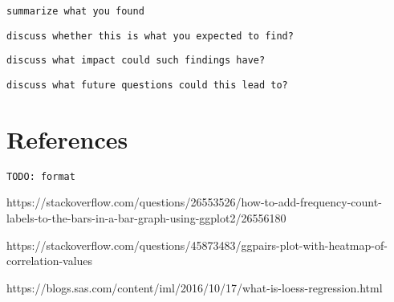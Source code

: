 \documentclass[11pt]{article}
\begin{document}
\texttt{summarize\ what\ you\ found}

\texttt{discuss\ whether\ this\ is\ what\ you\ expected\ to\ find?}

\texttt{discuss\ what\ impact\ could\ such\ findings\ have?}

\texttt{discuss\ what\ future\ questions\ could\ this\ lead\ to?}

    \hypertarget{references}{%
\section{References}\label{references}}

\texttt{TODO:\ format}

https://stackoverflow.com/questions/26553526/how-to-add-frequency-count-labels-to-the-bars-in-a-bar-graph-using-ggplot2/26556180

https://stackoverflow.com/questions/45873483/ggpairs-plot-with-heatmap-of-correlation-values

https://blogs.sas.com/content/iml/2016/10/17/what-is-loess-regression.html


    
    
    
    
\end{document}
